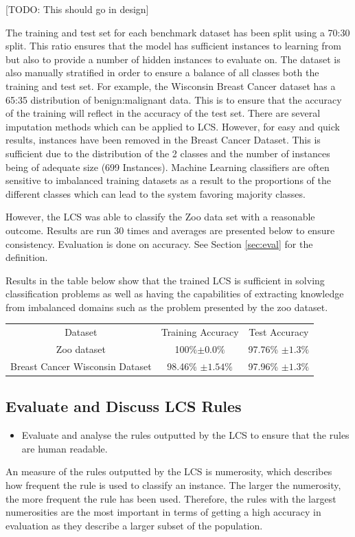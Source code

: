 [TODO: This should go in design]

The training and test set for each benchmark dataset has been split using a 70:30 split. This ratio ensures that the model has sufficient instances to learning from but also to provide a number of hidden instances to evaluate on. The dataset is also manually stratified in order to ensure a balance of all classes both the training and test set. For example, the Wisconsin Breast Cancer dataset has a 65:35 distribution of benign:malignant data. This is to ensure that the accuracy of the training will reflect in the accuracy of the test set. There are several imputation methods which can be applied to LCS. However, for easy and quick results, instances have been removed in the Breast Cancer Dataset. This is sufficient due to the distribution of the 2 classes and the number of instances being of adequate size (699 Instances).  Machine Learning classifiers are often sensitive to imbalanced training datasets as a result to the proportions of the different classes which can lead to the system favoring majority classes. 


However, the LCS was able to classify the Zoo data set with a reasonable outcome. Results are run 30 times and averages are presented below to ensure consistency. Evaluation is done on accuracy. See Section \ref{sec:eval} for the definition.

Results in the table below show that the trained LCS is sufficient in solving classification problems as well as having the capabilities of extracting knowledge from imbalanced domains such as the problem presented by the zoo dataset.

\begin{center}
	\begin{tabular}{ |c|c|c| } 
		\hline
		Dataset & Training Accuracy & Test Accuracy \\ 
		Zoo dataset & 100\%$\pm0.0\% $ & 97.76\% $\pm1.3\% $ \\ 
		Breast Cancer Wisconsin Dataset & 98.46\% $ \pm1.54\% $& 97.96\% $ \pm1.3\% $\\ 
		\hline
	\end{tabular}
\end{center}


\subsection{Evaluate and Discuss LCS Rules}
\begin{itemize}
	\item  Evaluate and analyse the rules outputted by the LCS to ensure that the rules are
human readable.
\end{itemize}
An measure of the rules outputted by the LCS is numerosity, which describes how frequent the rule is used to classify an instance. The larger the numerosity, the more frequent the rule has been used. Therefore, the rules with the largest numerosities are the most important in terms of getting a high accuracy in evaluation as they describe a larger subset of the population. 


